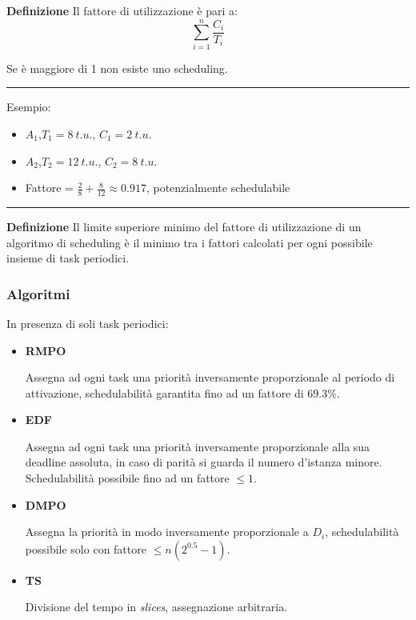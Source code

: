 \documentclass{article}
\newcommand{\df}[1]{\noindent\textbf{Definizione } #1.\newline}
\begin{document}
\noindent\textbf{Definizione} Il fattore di utilizzazione è pari a:
$$\sum_{i=1}^n\frac{C_i}{T_i}$$

\noindent Se è maggiore di 1 non esiste uno scheduling.\newline

\noindent\rule{\textwidth}{0.5pt}

\noindent Esempio:\newline

\begin{itemize}
    \item $A_1$,$T_1=8\ t.u.$, $C_1=2\ t.u.$
    \item $A_2$,$T_2=12\ t.u.$, $C_2=8\ t.u.$
    \item Fattore = $\frac{2}{8}+\frac{8}{12}\approx0.917$, potenzialmente schedulabile
\end{itemize}

\noindent\rule{\textwidth}{0.5pt}\newline

\df{Il limite superiore minimo del fattore di utilizzazione di un algoritmo di scheduling è il minimo tra i fattori calcolati per ogni possibile insieme di task periodici}

\subsubsection{Algoritmi}

In presenza di soli task periodici:
\begin{itemize}
    \item \textbf{RMPO}

        Assegna ad ogni task una priorità inversamente proporzionale al periodo di attivazione, schedulabilità garantita fino ad un fattore di $69.3\%$.

    \item \textbf{EDF}

        Assegna ad ogni task una priorità inversamente proporzionale alla sua deadline assoluta, in caso di parità si guarda il numero d'istanza minore. Schedulabilità possibile fino ad un fattore $\leq1$.

    \item \textbf{DMPO}

        Assegna la priorità in modo inversamente proporzionale a $D_i$, schedulabilità possibile solo con fattore $\leq n(2^{0.5}-1)$.
        
    \item \textbf{TS}

        Divisione del tempo in \textit{slices}, assegnazione arbitraria.\newline
    
\end{itemize}
\end{document}
